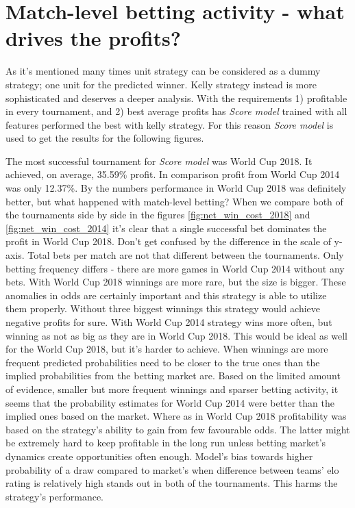 \section{Match-level betting activity - what drives the profits?}
As it's mentioned many times unit strategy can be considered as a dummy strategy; one unit for the predicted winner. Kelly strategy instead is more sophisticated and deserves a deeper analysis. With the requirements 1) profitable in every tournament, and 2) best average profits has \textit{Score model} trained with all features performed the best with kelly strategy. For this reason \textit{Score model} is used to get the results for the following figures.

The most successful tournament for \textit{Score model} was World Cup 2018. It achieved, on average, 35.59\% profit. In comparison profit from World Cup 2014 was only 12.37\%. By the numbers performance in World Cup 2018 was definitely better, but what happened with match-level betting? When we compare both of the tournaments side by side in the figures \ref{fig:net_win_cost_2018} and \ref{fig:net_win_cost_2014} it's clear that a single successful bet dominates the profit in World Cup 2018. Don't get confused by the difference in the scale of y-axis. Total bets per match are not that different between the tournaments. Only betting frequency differs - there are more games in World Cup 2014 without any bets. With World Cup 2018 winnings are more rare, but the size is bigger. These anomalies in odds are certainly important and this strategy is able to utilize them properly. Without three biggest winnings this strategy would achieve negative profits for sure. With World Cup 2014 strategy wins more often, but winning as not as big as they are in World Cup 2018. This would be ideal as well for the World Cup 2018, but it's harder to achieve. When winnings are more frequent predicted probabilities need to be closer to the true ones than the implied probabilities from the betting market are. Based on the limited amount of evidence, smaller but more frequent winnings and sparser betting activity, it seems that the probability estimates for World Cup 2014 were better than the implied ones based on the market. Where as in World Cup 2018 profitability was based on the strategy's ability to gain from few favourable odds. The latter might be extremely hard to keep profitable in the long run unless betting market's dynamics create opportunities often enough. Model's bias towards higher probability of a draw compared to market's when difference between teams' elo rating is relatively high stands out in both of the tournaments. This harms the strategy's performance.

